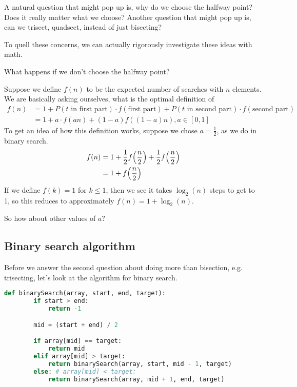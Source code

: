 \documentclass{article}
\begin{document}
A natural question that might pop up is, why do we choose the halfway point? Does it really matter what we choose?
Another question that might pop up is, can we trisect, quadsect, instead of just bisecting?

To quell these concerns, we can actually rigorously investigate these ideas with math.

\begin{problem}
    What happens if we don't choose the halfway point?

    Suppose we define $f(n)$ to be the expected number of searches with $n$ elements. 
    We are basically asking ourselves, what is the optimal definition of 
    \begin{align*}
        f(n) &= 1 + P(\text{$t$ in first part}) \cdot f(\text{first part}) +  
            P(\text{$t$ in second part}) \cdot f(\text{second part})\\
             &= 1 + a \cdot f(an) + (1-a)f((1-a)n), a \in [0, 1]
    \end{align*}
    To get an idea of how this definition works, suppose we chose $a = \frac{1}{2}$, as we do in binary search.
    \begin{align*}
        f(n) &= 1 + 
        \frac{1}{2}f\pa{\frac{n}{2}} + 
        \frac{1}{2}f\pa{\frac{n}{2}}\\
        &= 1 + f\pa{\frac{n}{2}}
    \end{align*}
    If we define $f(k) = 1$ for $k \leq 1$, then we see it takes $\log_2(n)$ steps to get to 1, so this reduces to approximately $f(n) = 1 + \log_2(n)$.

    So how about other values of $a$?
\end{problem}

\subsection{Binary search algorithm}

Before we answer the second question about doing more than bisection, e.g. trisecting, let's look at the algorithm for binary search.

\begin{lstlisting}[language=Python, caption={Python implementation for binary search},label={code:binary}]
    def binarySearch(array, start, end, target):
        if start > end:
            return -1

        mid = (start + end) / 2

        if array[mid] == target:
            return mid 
        elif array[mid] > target:
            return binarySearch(array, start, mid - 1, target)
        else: # array[mid] < target:
            return binarySearch(array, mid + 1, end, target)
\end{lstlisting}
\end{document}
